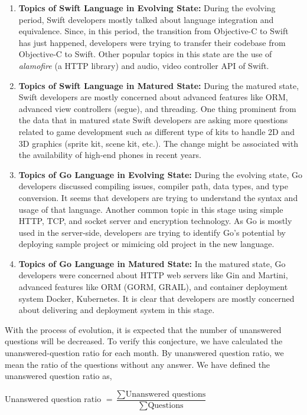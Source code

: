 \begin{enumerate}
\item \textbf{Topics of Swift Language in Evolving State:} During the evolving period, Swift developers mostly talked about language integration and equivalence. Since, in this period, the transition from Objective-C to Swift has just happened, developers were trying to transfer their codebase from Objective-C to Swift. Other popular topics in this state are the use of \emph{alamofire} (a HTTP library) and audio, video controller API of Swift.
\item \textbf{Topics of Swift Language in Matured State:} During the matured state, Swift developers are  mostly concerned about advanced features like ORM, advanced view controllers (segue), and threading. One thing prominent from the data that in matured state Swift developers are asking more questions related to game development such as different type of kits to handle 2D and 3D graphics (sprite kit, scene kit, etc.). The change might be associated with the availability of high-end phones in recent years.\citep{Aleem2016,Gavalas2011}
\item \textbf{Topics of Go Language in Evolving State:} During the evolving state, Go developers discussed compiling issues, compiler path, data types, and type conversion. It seems that developers are trying to understand the syntax and usage of that language. Another common topic in this stage using simple HTTP, TCP, and socket server and encryption technology. As Go is mostly used in the server-side, developers are trying to identify Go's potential by deploying sample project or mimicing old project in the new language.

\item \textbf{Topics of Go Language in Matured State:} In the matured state, Go developers were concerned about HTTP web servers like Gin and  Martini, advanced features like ORM (GORM, GRAIL), and container deployment system Docker, Kubernetes. It is clear that developers are mostly concerned about delivering and deployment system  in this stage.
\end{enumerate}

With the process of evolution, it is expected that the number of unanswered questions will be decreased. To verify this conjecture, we have calculated the unanswered-question ratio for each month. By unanswered question ratio, we mean the ratio of the questions without any answer. We have defined the unanswered question ratio as,

Unanswered question ratio $ = \dfrac{\sum \text{Unanswered questions}}{\sum \text{Questions}}$


